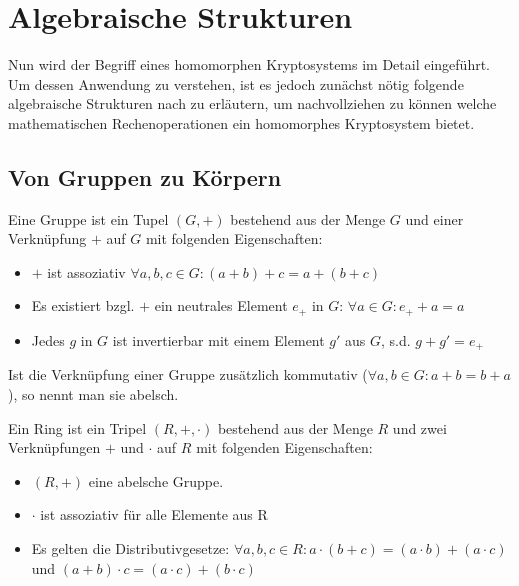 \section{Algebraische Strukturen}
\label{MG}

Nun wird der Begriff eines homomorphen Kryptosystems im Detail eingeführt. Um dessen Anwendung zu verstehen, ist es jedoch zunächst nötig folgende algebraische Strukturen nach \cite[p.43,54,56]{fischer2010lineare} zu erläutern, um nachvollziehen zu können welche mathematischen Rechenoperationen ein homomorphes Kryptosystem bietet.

\subsection{Von Gruppen zu Körpern}

\begin{theorem}[Gruppe]
	Eine Gruppe ist ein Tupel $(G,+)$ bestehend aus der Menge $G$ und einer Verknüpfung $+$ auf $G$ mit folgenden Eigenschaften:
	\begin{itemize}
		\item $+$ ist assoziativ $\forall a,b,c\in G: (a+b)+c=a+(b+c)$
		\item Es existiert bzgl. $+$ ein neutrales Element $e_+$ in $G$: $\forall a \in G: e_+ +a=a$
		\item Jedes $g$ in $G$ ist invertierbar mit einem Element $g'$ aus $G$, s.d. $g+g'=e_+$
	\end{itemize}
	
	Ist die Verknüpfung einer Gruppe zusätzlich kommutativ ($\forall a,b\in G: a+b=b+a$), so nennt man sie abelsch.
	
\end{theorem}

\begin{theorem}[Ring]
	\label{Ring}
	Ein Ring ist ein Tripel $(R,+,\cdot)$ bestehend aus der Menge $R$ und zwei Verknüpfungen $+$ und $\cdot$ auf $R$ mit folgenden Eigenschaften:
	\begin{itemize}
		\item $(R,+)$ eine abelsche Gruppe.
		\item $\cdot$ ist assoziativ für alle Elemente aus R
		\item Es gelten die Distributivgesetze: $\forall a,b,c\in R: a\cdot(b+c)=(a\cdot b)+(a\cdot c)$ und $(a+b)\cdot c = (a\cdot c)+(b\cdot c)$
	\end{itemize}
\end{theorem}


